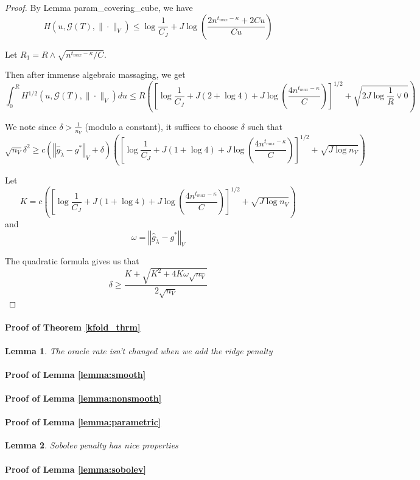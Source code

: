 \documentclass[12pt]{article}
\newtheorem{lemma}{Lemma}
\begin{document}
\begin{proof}
By Lemma param\_covering\_cube, we have
\[
H(u,\mathcal{G}(T),\|\cdot\|_{V})\le\log\frac{1}{C_{J}}+J\log\left(\frac{2n^{t_{max}-\kappa}+2Cu}{Cu}\right)
\]


Let $R_{1}=R\wedge\sqrt{n^{t_{max}-\kappa}/C}$.

Then after immense algebraic massaging, we get
\begin{equation}
\int_{0}^{R}H{}^{1/2}(u,\mathcal{G}(T),\|\cdot\|_{V})du
\le
R\left(\left[\log\frac{1}{C_{J}}+J(2+\log4)+J\log\left(\frac{4n^{t_{max}-\kappa}}{C}\right)\right]^{1/2}+\sqrt{2J\log\frac{1}{R}\vee0}\right)
\end{equation}

We note since $\delta > \frac{1}{n_{V}}$ (modulo a constant), it suffices to choose $\delta$ such that
\[
\sqrt{n_{V}}\delta^{2}\ge c\left(\left\Vert \hat{g}_{\tilde{\lambda}}-g^{*}\right\Vert _{V}+\delta\right)\left(\left[\log\frac{1}{C_{J}}+J(1+\log4)+J\log\left(\frac{4n^{t_{max}-\kappa}}{C}\right)\right]^{1/2}+\sqrt{J\log n_{V}}\right)
\]

Let 
\[
K=c\left(\left[\log\frac{1}{C_{J}}+J(1+\log4)+J\log\left(\frac{4n^{t_{max}-\kappa}}{C}\right)\right]^{1/2}+\sqrt{J\log n_{V}}\right)
\]
and 
\[
\omega=\left\Vert \hat{g}_{\tilde{\lambda}}-g^{*}\right\Vert _{V}
\]

The quadratic formula gives us that
\[
\delta\ge\frac{K+\sqrt{K^{2}+4K\omega\sqrt{n_{V}}}}{2\sqrt{n_{V}}}
\]
\end{proof}



\paragraph{Proof of Theorem \ref{kfold_thrm}}

\begin{lemma}
\label{oracle_maintained}
The oracle rate isn't changed when we add the ridge penalty
\end{lemma}

\paragraph{Proof of Lemma \ref{lemma:smooth}}
\paragraph{Proof of Lemma \ref{lemma:nonsmooth}}

\paragraph{Proof of Lemma \ref{lemma:parametric}}

\begin{lemma}
\label{lemma:sobolev_prop}
Sobolev penalty has nice properties
\end{lemma}

\paragraph{Proof of Lemma \ref{lemma:sobolev}}

\bigskip
\end{document}
